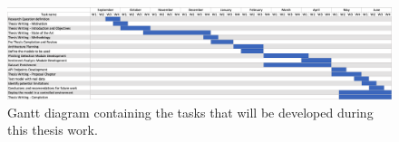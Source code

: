 \begin{figure}[H]
    \begin{center}
        \includegraphics[width=23cm, angle=90]{figs/gantt_chart.png}
        \caption{Gantt diagram containing the tasks that will be developed during this thesis work.}
        \label{fig:c3:gantt_chart}
    \end{center}
  \end{figure}